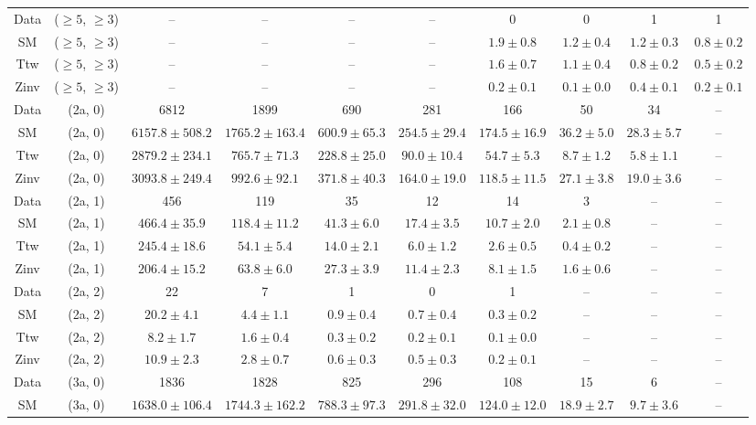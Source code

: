 \begin{table}[h!]
{\begin{tabular}{cccccccccc}
	Data & ($\ge5$, $\ge3$) & -- & -- & -- & -- & 0 & 0 & 1 & 1 \\[0.5ex] 
	SM & ($\ge5$, $\ge3$) & -- & -- & -- & -- & $1.9\pm 0.8$ & $1.2\pm 0.4$ & $1.2\pm 0.3$ & $0.8\pm 0.2$ \\[0.5ex] 
	Ttw & ($\ge5$, $\ge3$) & -- & -- & -- & -- & $1.6\pm 0.7$ & $1.1\pm 0.4$ & $0.8\pm 0.2$ & $0.5\pm 0.2$ \\[0.5ex] 
	Zinv & ($\ge5$, $\ge3$) & -- & -- & -- & -- & $0.2\pm 0.1$ & $0.1\pm 0.0$ & $0.4\pm 0.1$ & $0.2\pm 0.1$ \\[0.5ex] 
	Data & (2a, 0) & 6812 & 1899 & 690 & 281 & 166 & 50 & 34 & -- \\[0.5ex] 
	SM & (2a, 0) & $6157.8\pm 508.2$ & $1765.2\pm 163.4$ & $600.9\pm 65.3$ & $254.5\pm 29.4$ & $174.5\pm 16.9$ & $36.2\pm 5.0$ & $28.3\pm 5.7$ & -- \\[0.5ex] 
	Ttw & (2a, 0) & $2879.2\pm 234.1$ & $765.7\pm 71.3$ & $228.8\pm 25.0$ & $90.0\pm 10.4$ & $54.7\pm 5.3$ & $8.7\pm 1.2$ & $5.8\pm 1.1$ & -- \\[0.5ex] 
	Zinv & (2a, 0) & $3093.8\pm 249.4$ & $992.6\pm 92.1$ & $371.8\pm 40.3$ & $164.0\pm 19.0$ & $118.5\pm 11.5$ & $27.1\pm 3.8$ & $19.0\pm 3.6$ & -- \\[0.5ex] 
	Data & (2a, 1) & 456 & 119 & 35 & 12 & 14 & 3 & -- & -- \\[0.5ex] 
	SM & (2a, 1) & $466.4\pm 35.9$ & $118.4\pm 11.2$ & $41.3\pm 6.0$ & $17.4\pm 3.5$ & $10.7\pm 2.0$ & $2.1\pm 0.8$ & -- & -- \\[0.5ex] 
	Ttw & (2a, 1) & $245.4\pm 18.6$ & $54.1\pm 5.4$ & $14.0\pm 2.1$ & $6.0\pm 1.2$ & $2.6\pm 0.5$ & $0.4\pm 0.2$ & -- & -- \\[0.5ex] 
	Zinv & (2a, 1) & $206.4\pm 15.2$ & $63.8\pm 6.0$ & $27.3\pm 3.9$ & $11.4\pm 2.3$ & $8.1\pm 1.5$ & $1.6\pm 0.6$ & -- & -- \\[0.5ex] 
	Data & (2a, 2) & 22 & 7 & 1 & 0 & 1 & -- & -- & -- \\[0.5ex] 
	SM & (2a, 2) & $20.2\pm 4.1$ & $4.4\pm 1.1$ & $0.9\pm 0.4$ & $0.7\pm 0.4$ & $0.3\pm 0.2$ & -- & -- & -- \\[0.5ex] 
	Ttw & (2a, 2) & $8.2\pm 1.7$ & $1.6\pm 0.4$ & $0.3\pm 0.2$ & $0.2\pm 0.1$ & $0.1\pm 0.0$ & -- & -- & -- \\[0.5ex] 
	Zinv & (2a, 2) & $10.9\pm 2.3$ & $2.8\pm 0.7$ & $0.6\pm 0.3$ & $0.5\pm 0.3$ & $0.2\pm 0.1$ & -- & -- & -- \\[0.5ex] 
	Data & (3a, 0) & 1836 & 1828 & 825 & 296 & 108 & 15 & 6 & -- \\[0.5ex] 
	SM & (3a, 0) & $1638.0\pm 106.4$ & $1744.3\pm 162.2$ & $788.3\pm 97.3$ & $291.8\pm 32.0$ & $124.0\pm 12.0$ & $18.9\pm 2.7$ & $9.7\pm 3.6$ & -- \\[0.5ex] 

\end{tabular}}
\end{table}
